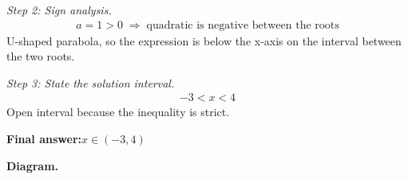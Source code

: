\documentclass[11pt]{article}
\begin{document}
\textit{Step 2: Sign analysis.}
\[\begin{gathered}
a = 1 > 0 \;\Longrightarrow\; \text{quadratic is negative between the roots}
\end{gathered}\]
U-shaped parabola, so the expression is below the x-axis on the interval between the two roots.

\textit{Step 3: State the solution interval.}
\[\begin{gathered}
-3 < x < 4
\end{gathered}\]
Open interval because the inequality is strict.

\begin{answerbox}
\textbf{Final answer:}\quad \(\displaystyle x \in (-3, 4)\)
\end{answerbox}
\textbf{Diagram.}

\begin{center}
\end{center}
\end{document}
